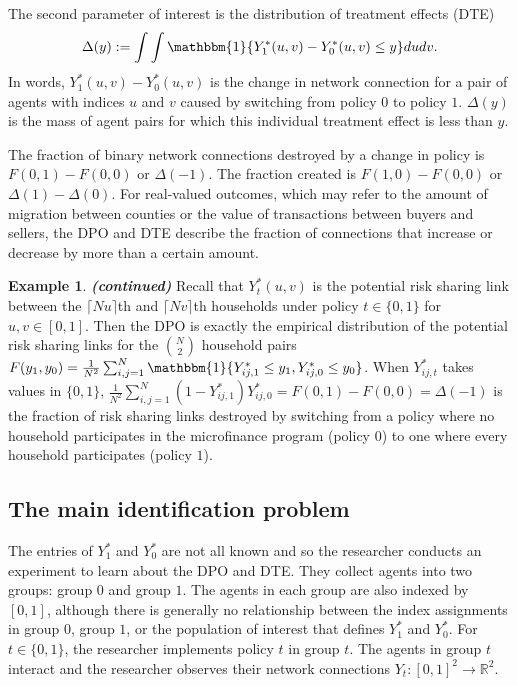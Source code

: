 \documentclass[12pt]{article}
\theoremstyle{definition}
\newtheorem{myexp}{Example}
\newenvironment{myexpcont}
{\addtocounter{myexp}{-1}\begin{myexp}{\textit{\textbf{{(continued)}}}}}
  {\end{myexp}}
\begin{document}
The second parameter of interest is the distribution of treatment effects (DTE)
\begin{align}\label{te}
\Delta(y) := \int\int\mathbbm{1}\{Y^{*}_{1}(u,v) - Y^{*}_{0}(u,v) \leq y\} dudv.
\end{align}
In words,  $Y^{*}_{1}(u,v) - Y^{*}_{0}(u,v)$ is the change in network connection for a pair of agents with indices $u$ and $v$ caused by switching from policy $0$ to policy $1$. $\Delta(y)$ is the mass of agent pairs for which this individual treatment effect is less than $y$. 

The fraction of binary network connections destroyed by a change in policy is $F(0,1) - F(0,0)$ or $\Delta(-1)$. The fraction created is $F(1,0) - F(0,0)$ or $\Delta(1)-\Delta(0)$. For real-valued outcomes, which  may refer to the amount of migration between counties or the value of transactions between buyers and sellers, the DPO and DTE  describe the fraction of connections that increase or decrease by more than a certain amount. 


\begin{myexpcont}
Recall that $Y_{t}^{*}(u,v)$ is the potential risk sharing link between the $\lceil Nu\rceil$th and $\lceil Nv \rceil$th households under policy $t \in \{0,1\}$ for $u,v \in [0,1]$. Then the DPO is exactly the empirical distribution of the potential risk sharing links for the $N\choose 2$ household pairs $F(y_{1},y_{0}) = \frac{1}{N^{2}}\sum_{i,j=1}^{N}\mathbbm{1}\{Y_{ij,1}^{*} \leq y_{1}, Y_{ij,0}^{*} \leq y_{0}\}$. When $Y_{ij,t}^{*}$ takes values in $\{0,1\}$, $\frac{1}{N^2}\sum_{i,j=1}^{N}(1-Y_{ij,1}^{*})Y_{ij,0}^{*} = F(0,1) - F(0,0) = \Delta(-1)$ is the fraction of risk sharing links destroyed by switching from a policy where no household participates in the microfinance program (policy $0$) to one where every household participates (policy $1$). 
\end{myexpcont}



\subsection{The main identification problem}
The entries of $Y_{1}^{*}$ and $Y_{0}^{*}$ are not all known and so the researcher conducts an experiment to learn about the DPO and DTE. They collect agents into two groups: group $0$ and group $1$. The agents in each group are also indexed by $[0,1]$, although there is generally no relationship between the index assignments in group $0$, group $1$, or the population of interest that defines $Y_{1}^{*}$ and $Y_{0}^{*}$. For $t \in \{0,1\}$, the researcher implements policy $t$ in group $t$. The agents in group $t$ interact and the researcher observes their network connections $Y_{t}: [0,1]^{2} \to \mathbb{R}^{2}$.   
\end{document}
